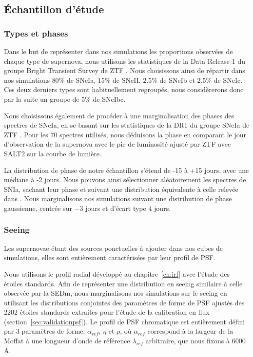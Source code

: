 \documentclass[../main/main.tex]{subfiles}
\begin{document}
\subsection{\'Echantillon d'étude}

\subsubsection{Types et phases}

Dans le but de représenter dans nos simulations les proportions
observées de chaque
type de supernova, nous utilisons les statistiques de la Data
Release 1 du groupe Bright Transient Survey de ZTF
\citep[BTS;][]{FremlingZTFspec2020}.
Nous choisissons ainsi de répartir dans nos simulations $80\%$ de SNeIa,
$15\%$ de SNeII, $2.5\%$ de SNeIb et $2.5\%$ de SNeIc. Ces deux derniers
types sont habituellement regroupés, nous considèrerons donc par la
suite un groupe de $5\%$ de SNeIbc.

Nous choisissons également de 
procéder à une marginalisation des phases des spectres de SNeIa, en se
basant sur les statistiques de la
DR1 du groupe SNeIa de ZTF \citep{DhawanZTFDR1}. Pour
les 70 spectres utilisés, nous déduisons la phase en comparant le
jour d'observation de la supernova avec le pic
de luminosité ajusté par ZTF avec SALT2
\citep{Guysalt2005,Guysalt22007,Guy2010,Betoule2014} sur la courbe de
lumière.

La distribution de phase de notre échantillon s'étend de -15 à
+15 jours, avec une médiane à -2 jours. Nous pouvons ainsi sélectionner
aléatoirement les spectres de SNIa, sachant leur phase et suivant une
distribution équivalente à celle relevée dans \citet{DhawanZTFDR1}. Nous marginalisons nos simulations suivant
une distribution de phase gaussienne, centrée sur $-3$ jours et d'écart
type $4$ jours.

\subsubsection{Seeing}

Les supernovae étant des sources ponctuelles à ajouter dans nos cubes
de simulations, elles sont entièrement caractérisées par leur profil de
PSF.

Nous utilisons le profil radial développé au chapitre~\ref{ch:irf} avec
l'étude des étoiles standards. Afin de représenter une distribution en
seeing similaire à celle observée par la SEDm, nous marginalisons nos
simulations sur le seeing en utilisant les
distributions conjointes des paramètres de forme de PSF ajustés des $2202$
étoiles standards extraites pour l'étude de la calibration en
flux (section~\ref{sec:validationpsf}). Le profil de PSF chromatique est
entièrement défini par $3$ paramètres de forme: $\alpha_{ref}$, $\eta$ et $\rho$,
où $\alpha_{ref}$ correspond à la largeur de la Moffat à une longueur
d'onde de référence $\lambda_{ref}$ arbitraire, que nous fixons à $6000$ \AA.
\end{document}
